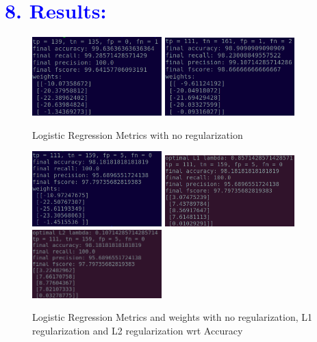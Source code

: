 \documentclass[a4paper,10pt,twoside]{article}
\begin{document}
\section*{\textcolor{blue}{8. Results:}}
\begin{figure}[h!]
\centering
\includegraphics[scale=1.0, width=5cm]{Fig1.png}
\includegraphics[scale=1.0, width=5cm]{Fig2.png}
\caption*{Logistic Regression Metrics with no regularization}
\end{figure}

\begin{figure}[h!]
\centering
\includegraphics[scale=1.0, width=5cm]{Fig3.png}
\includegraphics[scale=1.0, width=5cm]{Fig4.png}
\includegraphics[scale=1.0, width=5cm]{Fig5.png}
\caption*{Logistic Regression Metrics and weights with no regularization, L1 regularization and L2 regularization wrt Accuracy}
\end{figure}
\end{document}

